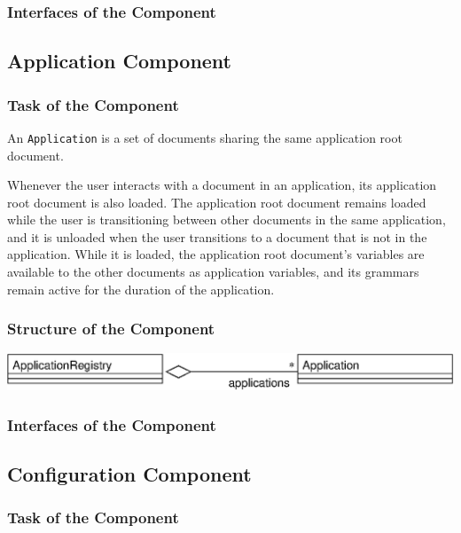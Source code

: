 \documentclass[11pt,a4paper]{article}
\begin{document}
\subsubsection{Interfaces of the Component}

\subsection{Application Component}

\subsubsection{Task of the Component}

An \texttt{Application} is a set of documents sharing the same 
application root document.

Whenever the user interacts with a document in an application, its
application root document is also loaded. The application root document
remains loaded while the user is transitioning between other documents in the
same application, and it is unloaded when the user transitions to a document
that is not in the application. While it is loaded, the application root
document's variables are available to the other documents as application
variables, and its grammars remain active for the duration of the
application.

\subsubsection{Structure of the Component}

\begin{center}
\includegraphics[scale=0.6]{class-application.eps}
\end{center}

\subsubsection{Interfaces of the Component}

\subsection{Configuration Component}
\label{sec:conf-comp}

\subsubsection{Task of the Component}
\end{document}
